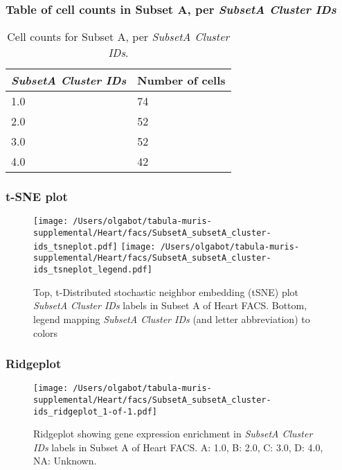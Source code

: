\subsubsection{Table of cell counts in Subset A, per \emph{SubsetA Cluster IDs}}\begin{table}[h]
\centering
\label{my-label}
\begin{tabular}{@{}ll@{}}
\toprule

\emph{SubsetA Cluster IDs}& Number of cells \\ \midrule
1.0 & 74 \\

2.0 & 52 \\

3.0 & 52 \\

4.0 & 42 \\
\bottomrule
\end{tabular}
\caption{Cell counts for Subset A, per \emph{SubsetA Cluster IDs}.}
\end{table}

\clearpage
\subsubsection{t-SNE plot}
\begin{figure}[h]
\centering
\texttt{[image: /Users/olgabot/tabula-muris-supplemental/Heart/facs/SubsetA\_subsetA\_cluster-ids\_tsneplot.pdf]}
\texttt{[image: /Users/olgabot/tabula-muris-supplemental/Heart/facs/SubsetA\_subsetA\_cluster-ids\_tsneplot\_legend.pdf]}
\caption{Top, t-Distributed stochastic neighbor embedding (tSNE) plot  \emph{SubsetA Cluster IDs} labels in Subset A of Heart FACS. Bottom, legend mapping \emph{SubsetA Cluster IDs} (and letter abbreviation) to colors}
\end{figure}


\clearpage

\subsubsection{Ridgeplot}
\begin{figure}[h]
\centering
\texttt{[image: /Users/olgabot/tabula-muris-supplemental/Heart/facs/SubsetA\_subsetA\_cluster-ids\_ridgeplot\_1-of-1.pdf]}

\caption{ Ridgeplot  showing gene expression enrichment in \emph{SubsetA Cluster IDs} labels in Subset A of Heart FACS. A: 1.0, B: 2.0, C: 3.0, D: 4.0, NA: Unknown.}
\end{figure}


